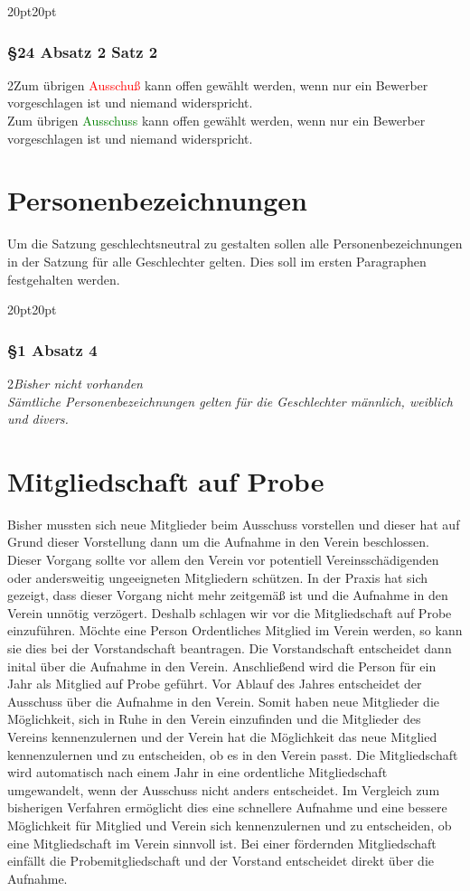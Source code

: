 \documentclass[10pt,a4paper,parskip=half]{scrartcl}
\newcommand{\new}[1]{\textcolor{Green}{#1}}
\newcommand{\old}[1]{\textcolor{Red}{#1}}
\newcommand{\change}[1]{
  \begin{adjustwidth}{20pt}{20pt}
    #1
  \end{adjustwidth}
}
\newcommand{\compare}[3]{\change{\subsubsection*{#1}\begin{multicols}{2}#2\columnbreak\\#3\end{multicols}}}
\begin{document}
  \compare{§24 Absatz 2 Satz 2}
  {Zum übrigen \old{Ausschuß} kann offen gewählt werden, wenn nur ein Bewerber vorgeschlagen ist und niemand widerspricht.}
  {Zum übrigen \new{Ausschuss} kann offen gewählt werden, wenn nur ein Bewerber vorgeschlagen ist und niemand widerspricht.}
  \clearpage
  \section{Personenbezeichnungen}
  Um die Satzung geschlechtsneutral zu gestalten sollen alle Personenbezeichnungen in der Satzung für alle Geschlechter gelten. Dies soll im ersten Paragraphen festgehalten werden.

  \compare{§1 Absatz 4}{\em Bisher nicht vorhanden \em}{Sämtliche Personenbezeichnungen gelten für die Geschlechter männlich, weiblich und divers.}

  \clearpage
  \section{Mitgliedschaft auf Probe}
  Bisher mussten sich neue Mitglieder beim Ausschuss vorstellen und dieser hat auf Grund dieser Vorstellung dann um die Aufnahme in den Verein beschlossen. Dieser Vorgang sollte vor allem den Verein vor potentiell Vereinsschädigenden oder andersweitig ungeeigneten Mitgliedern schützen. In der Praxis hat sich gezeigt, dass dieser Vorgang nicht mehr zeitgemäß ist und die Aufnahme in den Verein unnötig verzögert. Deshalb schlagen wir vor die Mitgliedschaft auf Probe einzuführen. Möchte eine Person Ordentliches Mitglied im Verein werden, so kann sie dies bei der Vorstandschaft beantragen. Die Vorstandschaft entscheidet dann inital über die Aufnahme in den Verein. Anschließend wird die Person für ein Jahr als Mitglied auf Probe geführt. Vor Ablauf des Jahres entscheidet der Ausschuss über die Aufnahme in den Verein. Somit haben neue Mitglieder die Möglichkeit, sich in Ruhe in den Verein einzufinden und die Mitglieder des Vereins kennenzulernen und der Verein hat die Möglichkeit das neue Mitglied kennenzulernen und zu entscheiden, ob es in den Verein passt. Die Mitgliedschaft wird automatisch nach einem Jahr in eine ordentliche Mitgliedschaft umgewandelt, wenn der Ausschuss nicht anders entscheidet. Im Vergleich zum bisherigen Verfahren ermöglicht dies eine schnellere Aufnahme und eine bessere Möglichkeit für Mitglied und Verein sich kennenzulernen und zu entscheiden, ob eine Mitgliedschaft im Verein sinnvoll ist. Bei einer fördernden Mitgliedschaft einfällt die Probemitgliedschaft und der Vorstand entscheidet direkt über die Aufnahme.
\end{document}
